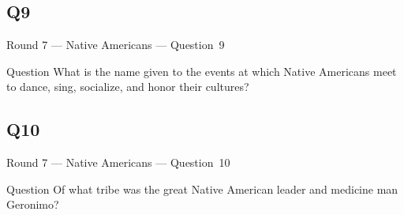 \documentclass[11pt]{beamer}
\begin{document}
\subsection*{Q9}
\begin{frame}[t]{Round 7 --- Native Americans --- \mbox{Question 9}}
    \vspace{-0.5em}
    \begin{block}{Question}
        What is the name given to the events at which Native Americans meet to dance, sing, socialize, and honor their cultures?
    \end{block}
\end{frame}
\subsection*{Q10}
\begin{frame}[t]{Round 7 --- Native Americans --- \mbox{Question 10}}
    \vspace{-0.5em}
    \begin{block}{Question}
        Of what tribe was the great Native American leader and medicine man Geronimo?
    \end{block}
\end{frame}
\end{document}
